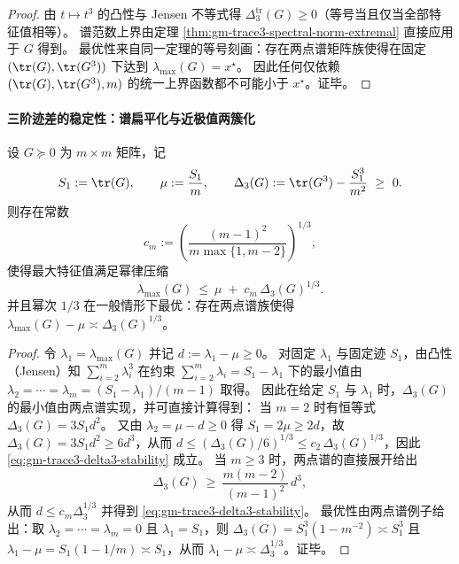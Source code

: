 \begin{proof}
由 \(t\mapsto t^3\) 的凸性与 Jensen 不等式得 \(\Delta^{\mathrm{tr}}_3(G)\ge 0\)（等号当且仅当全部特征值相等）。
谱范数上界由定理 \ref{thm:gm-trace3-spectral-norm-extremal} 直接应用于 \(G\) 得到。
最优性来自同一定理的等号刻画：存在两点谱矩阵族使得在固定 \((\tr(G),\tr(G^3))\) 下达到 \(\lambda_{\max}(G)=x^\star\)。
因此任何仅依赖 \((\tr(G),\tr(G^3),m)\) 的统一上界函数都不可能小于 \(x^\star\)。证毕。
\end{proof}

\paragraph{三阶迹差的稳定性：谱扁平化与近极值两簇化}
\begin{proposition}\label{prop:gm-trace3-delta3-stability}
设 \(G\succeq 0\) 为 \(m\times m\) 矩阵，记
\[
S_1:=\tr(G),\qquad \mu:=\frac{S_1}{m},\qquad
\Delta_3(G):=\tr(G^3)-\frac{S_1^3}{m^2}\ \ge\ 0.
\]
则存在常数
\[
c_m:=\left(\frac{(m-1)^2}{m\max\{1,m-2\}}\right)^{1/3},
\]
使得最大特征值满足幂律压缩
\begin{equation}\label{eq:gm-trace3-delta3-stability}
\boxed{\;
\lambda_{\max}(G)\ \le\ \mu\;+\;c_m\,\Delta_3(G)^{1/3}.\;}
\end{equation}
并且幂次 \(1/3\) 在一般情形下最优：存在两点谱族使得
\(\lambda_{\max}(G)-\mu\asymp \Delta_3(G)^{1/3}\)。
\end{proposition}

\begin{proof}
令 \(\lambda_1=\lambda_{\max}(G)\) 并记 \(d:=\lambda_1-\mu\ge 0\)。
对固定 \(\lambda_1\) 与固定迹 \(S_1\)，由凸性（Jensen）知 \(\sum_{i=2}^{m}\lambda_i^3\) 在约束 \(\sum_{i=2}^{m}\lambda_i=S_1-\lambda_1\) 下的最小值由 \(\lambda_2=\cdots=\lambda_m=(S_1-\lambda_1)/(m-1)\) 取得。
因此在给定 \(S_1\) 与 \(\lambda_1\) 时，\(\Delta_3(G)\) 的最小值由两点谱实现，并可直接计算得到：
当 \(m=2\) 时有恒等式 \(\Delta_3(G)=3S_1d^2\)。
又由 \(\lambda_2=\mu-d\ge 0\) 得 \(S_1=2\mu\ge 2d\)，故 \(\Delta_3(G)=3S_1d^2\ge 6d^3\)，从而 \(d\le (\Delta_3(G)/6)^{1/3}\le c_2\,\Delta_3(G)^{1/3}\)，因此 \eqref{eq:gm-trace3-delta3-stability} 成立。
当 \(m\ge 3\) 时，两点谱的直接展开给出
\[
\Delta_3(G)
\ \ge\
\frac{m(m-2)}{(m-1)^2}\,d^3,
\]
从而 \(d\le c_m\Delta_3^{1/3}\) 并得到 \eqref{eq:gm-trace3-delta3-stability}。
最优性由两点谱例子给出：取 \(\lambda_2=\cdots=\lambda_m=0\) 且 \(\lambda_1=S_1\)，则 \(\Delta_3(G)=S_1^3(1-m^{-2})\asymp S_1^3\) 且 \(\lambda_1-\mu=S_1(1-1/m)\asymp S_1\)，从而 \(\lambda_1-\mu\asymp \Delta_3^{1/3}\)。证毕。
\end{proof}

